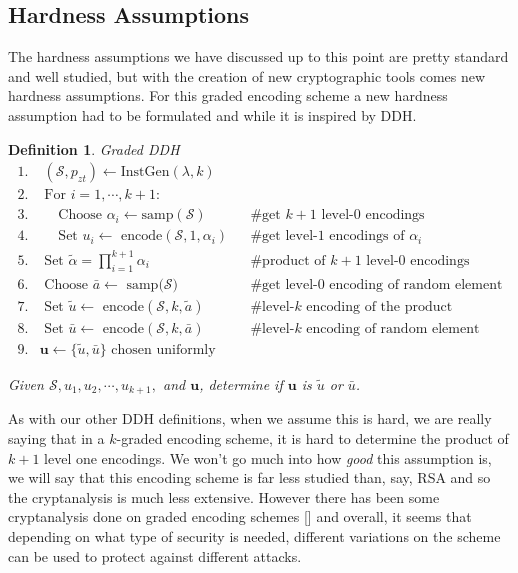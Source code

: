 \documentclass[12pt,twoside]{reedthesis}
\newtheorem{definition}{Definition}
\begin{document}
    
    
    
    \subsection{Hardness Assumptions}
    
    The hardness assumptions we have discussed up to this point are pretty standard and well studied, but with the creation of new cryptographic tools comes new hardness assumptions. For this graded encoding scheme a new hardness assumption had to be formulated and while it is inspired by DDH.
        
    \begin{definition}{Graded DDH}
    \begin{align*}
    1. &\; (\mathcal{S},p_{zt}) \leftarrow \text{InstGen}(\lambda,k) && \\
    2. & \text{ For } i = 1,\cdots,k+1: && \\
    3. &\quad \text{ Choose } \alpha_i \leftarrow \text{samp}(\mathcal{S}) && \text{\# get $k+1$ level-0 encodings} \\
    4. &\quad \text{ Set $u_i \leftarrow$ encode$(\mathcal{S},1,\alpha_i)$} &&\text{\# get level-1 encodings of $\alpha_i$} \\
    5. & \text{ Set $\tilde{\alpha} = \prod_{i=1}^{k+1}$}\alpha_i &&\text{\# product of $k+1$ level-0 encodings} \\
    6. & \text{ Choose $\bar{a} \leftarrow$ samp($\mathcal{S}$)} &&\text{\# get level-0 encoding of random element} \\
    7. & \text{ Set $\tilde{u} \leftarrow$ encode$(\mathcal{S},k,\tilde{a})$} &&\text{\# level-$k$ encoding of the product} \\
    8. & \text{ Set $\bar{u}\leftarrow$ encode$(\mathcal{S},k,\bar{a})$} &&\text{\# level-$k$ encoding of random element} \\
    9. & \boldsymbol{u} \leftarrow \{\tilde{u},\bar{u} \} \text{ chosen uniformly} &&
    \end{align*}
    \par Given $\mathcal{S},u_1,u_2,\cdots,u_{k+1},$ and $\boldsymbol{u}$, determine if $\boldsymbol{u}$ is $\tilde{u}$ or $\bar{u}$.
    \end{definition}
    
    As with our other DDH definitions, when we assume this is hard, we are really saying that in a $k$-graded encoding scheme, it is hard to determine the product of $k+1$ level one encodings. We won't go much into how \textit{good} this assumption is, we will say that this encoding scheme is far less studied than, say, RSA and so the cryptanalysis is much less extensive. However there has been some cryptanalysis done on graded encoding schemes [\cite{GGH13}] and overall, it seems that depending on what type of security is needed, different variations on the scheme can be used to protect against different attacks.     
    
\end{document}
